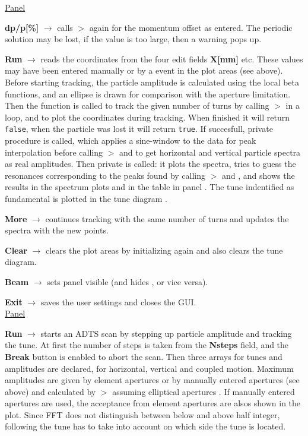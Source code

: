 \documentclass[12pt]{article}
\newcommand\code[1]{{\tt #1}}
\newcommand{\ofld}[1]{\colorbox{black!15}{{\bf #1}}}
\newcommand\guico[1]{{\color{blue}\code{#1}}}
\newcommand\guifco[1]{{\color{violet}\code{#1}}}
\newcommand{\unico}[1]{{\color{burntorange}\code{#1}}}
\newcommand{\evcod}[2]{\ofld{#1} $\rightarrow$ \guico{#2}}
\newcommand{\prcod}[2]{\opauni{#1}$>$\unico{#2}}
\newcommand{\opagui}[1]{\colorbox{blue!20}{{\color{black}\code{#1}}}}
\newcommand{\ogui}[1]{\hyperref[#1]{\opagui{#1}}}
\newcommand{\opaguif}[1]{\colorbox{violet!30}{{\color{black}\code{#1}}}}
\newcommand{\oguif}[1]{\hyperref[#1]{\opaguif{#1}}}
\newcommand{\opauni}[1]{\colorbox{orange!30}{{\color{black}\code{#1}}}}
\begin{document}
\underline{Panel \guico{PanCtrl}}

\evcod{dp/p[\%]}{ediAction[edidpp]} calls \prcod{tracklib}{Initdpp} again for the momentum offset as entered. The periodic solution may be lost, if the value is too large, then a warning pops up. 

\evcod{Run}{butRunClick} reads the coordinates from the four edit fields \ofld{X[mm]} etc. These values may have been entered manually or by a \guifco{pMouseDown} event in the \guico{psx,psy} plot areas (see \oguif{../com/asfigure} above). Before starting tracking, the particle amplitude is calculated using the local beta functions, and an ellipse is drawn for comparison with the aperture limitation. Then the function \guico{Track} is called to track the given number of turns by calling 
\prcod{tracklib}{Oneturn} in a loop, and to plot the coordinates during tracking. When finished it will return \code{false}, when the particle was lost it will return \code{true}. If succesfull, private procedure \guico{Spectrum} is called, which applies a sine-window to the data for peak interpolation before calling \prcod{tracklib}{TWOFFT} and \unico{FFTtoAmp} to get horizontal and vertical particle spectra as real amplitudes. Then private \guico{FFTplot} is called: it plots the spectra, tries to guess the resonances corresponding to the peaks found by calling \prcod{tracklib}{FindPeaks} and \unico{ResoGuess}, and shows the results in the spectrum plots and in the table \guico{resgrid} in panel \guico{PanRes}. The tune indentified as fundamental is plotted in the tune diagram \ogui{opatunediag}.

\evcod{More}{butMoreClick} continues tracking with the same number of turns and updates the spectra with the new points.

\evcod{Clear}{butClearClick} clears the plot areas by initializing again and also clears the tune diagram.

\evcod{Beam}{butBeamClick} sets panel \guico{PanBeam} visible (and hides \guico{PanTush}, or vice versa).

\evcod{Exit}{butExitClick} saves the user settings and closes the GUI.\\[1ex]

\underline{Panel \guico{PanTush}}

\evcod{Run}{butTushClick} starts an ADTS scan by stepping up particle amplitude and tracking the tune. At first the number of steps is taken from the \ofld{Nsteps} field, and the \ofld{Break} button is enabled to abort the scan. Then three arrays for tunes and amplitudes are declared, for horizontal, vertical and coupled motion. Maximum amplitudes are given by element apertures or by manually entered apertures (see above) and calculated by \prcod{tracklib}{AmpKappa} assuming elliptical apertures \cite{inside}.  If manually entered apertures are used, the acceptance from element apertures are alsos shown in the plot. Since FFT does not distinguish between below and above half integer, following the tune has to take into account on which side the tune is located.
\end{document}
